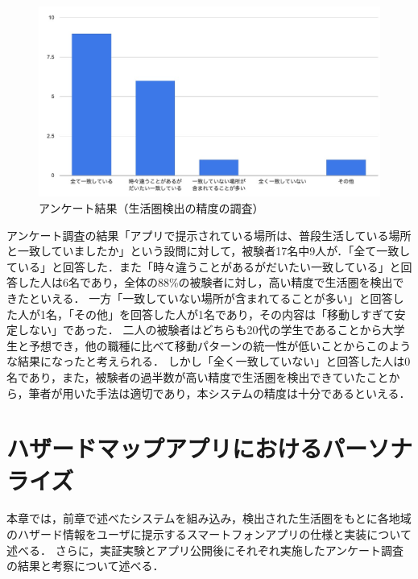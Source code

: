 \documentclass[a4paper]{jsarticle}
\begin{document}
\fifigure
\begin{figure}[H]
  \begin{center}
    \includegraphics[width=0.9\hsize]{./images/system_result.jpg}
    \caption{アンケート結果（生活圏検出の精度の調査）}
    \label{fig:system-result}
  \end{center}
\end{figure}
\fi

アンケート調査の結果「アプリで提示されている場所は、普段生活している場所と一致していましたか」という設問に対して，被験者17名中9人が．「全て一致している」と回答した．また「時々違うことがあるがだいたい一致している」と回答した人は6名であり，全体の88\%の被験者に対し，高い精度で生活圏を検出できたといえる．
一方「一致していない場所が含まれてることが多い」と回答した人が1名，「その他」を回答した人が1名であり，その内容は「移動しすぎて安定しない」であった．
二人の被験者はどちらも20代の学生であることから大学生と予想でき，他の職種に比べて移動パターンの統一性が低いことからこのような結果になったと考えられる．
しかし「全く一致していない」と回答した人は0名であり，また，被験者の過半数が高い精度で生活圏を検出できていたことから，筆者が用いた手法は適切であり，本システムの精度は十分であるといえる．




\section{ハザードマップアプリにおけるパーソナライズ}
本章では，前章で述べたシステムを組み込み，検出された生活圏をもとに各地域のハザード情報をユーザに提示するスマートフォンアプリの仕様と実装について述べる．
さらに，実証実験とアプリ公開後にそれぞれ実施したアンケート調査の結果と考察について述べる．
\end{document}
